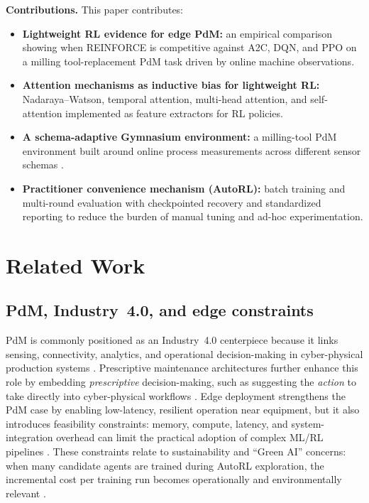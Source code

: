 \documentclass[sn-basic]{sn-jnl} %
\begin{document}
\textbf{Contributions.}
This paper contributes:
\begin{itemize}
        \item \textbf{Lightweight RL evidence for edge PdM:} an empirical comparison showing when \textsc{REINFORCE} is competitive against \textsc{A2C}, \textsc{DQN}, and \textsc{PPO} on a milling tool-replacement PdM task driven by online machine observations.
        \item \textbf{Attention mechanisms as inductive bias for lightweight RL:} Nadaraya--Watson, temporal attention, multi-head attention, and self-attention implemented as feature extractors for RL policies.
        \item \textbf{A schema-adaptive Gymnasium environment:} a milling-tool PdM environment built around online process measurements across different sensor schemas \cite{Foundation2023}.
        \item \textbf{Practitioner convenience mechanism (AutoRL):} batch training and multi-round evaluation with checkpointed recovery and standardized reporting to reduce the burden of manual tuning and ad-hoc experimentation.
\end{itemize}

\section{Related Work}
\subsection{PdM, Industry~4.0, and edge constraints}
PdM is commonly positioned as an Industry~4.0 centerpiece because it links sensing, connectivity, analytics, and operational decision-making in cyber-physical production systems \cite{Compare2020, Zonta2020}. Prescriptive maintenance architectures further enhance this role by embedding \emph{prescriptive} decision-making, such as suggesting the \emph{action} to take directly into cyber-physical workflows \cite{Ansari2019}. Edge deployment strengthens the PdM case by enabling low-latency, resilient operation near equipment, but it also introduces feasibility constraints: memory, compute, latency, and system-integration overhead can limit the practical adoption of complex ML/RL pipelines \cite{Njor2024, Pandey2023}. These constraints relate to sustainability and ``Green AI'' concerns: when many candidate agents are trained during AutoRL exploration, the incremental cost per training run becomes operationally and environmentally relevant \cite{Schwartz2020, Strubell2019}.
\end{document}
